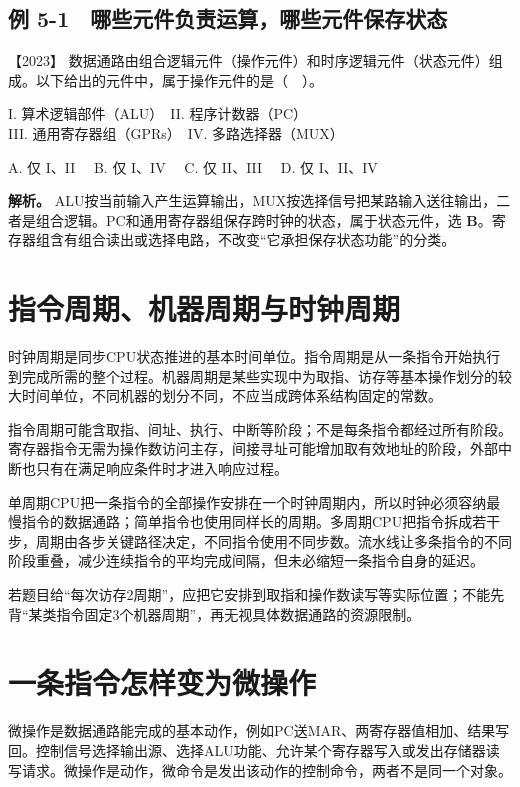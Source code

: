 \subsection{例 5-1　哪些元件负责运算，哪些元件保存状态}\label{co-ex5-1}

\noindent{}【2023】 数据通路由组合逻辑元件（操作元件）和时序逻辑元件（状态元件）组成。以下给出的元件中，属于操作元件的是（　）。

I. 算术逻辑部件（ALU）　II. 程序计数器（PC）\\
III. 通用寄存器组（GPRs）　IV. 多路选择器（MUX）

A. 仅 I、II　 B. 仅 I、IV　 C. 仅 II、III　 D. 仅 I、II、IV


\textbf{解析。} ALU按当前输入产生运算输出，MUX按选择信号把某路输入送往输出，二者是组合逻辑。PC和通用寄存器组保存跨时钟的状态，属于状态元件，选 \textbf{B}。寄存器组含有组合读出或选择电路，不改变``它承担保存状态功能''的分类。

\section{指令周期、机器周期与时钟周期}\label{co-05-02}

时钟周期是同步CPU状态推进的基本时间单位。指令周期是从一条指令开始执行到完成所需的整个过程。机器周期是某些实现中为取指、访存等基本操作划分的较大时间单位，不同机器的划分不同，不应当成跨体系结构固定的常数。

指令周期可能含取指、间址、执行、中断等阶段；不是每条指令都经过所有阶段。寄存器指令无需为操作数访问主存，间接寻址可能增加取有效地址的阶段，外部中断也只有在满足响应条件时才进入响应过程。

单周期CPU把一条指令的全部操作安排在一个时钟周期内，所以时钟必须容纳最慢指令的数据通路；简单指令也使用同样长的周期。多周期CPU把指令拆成若干步，周期由各步关键路径决定，不同指令使用不同步数。流水线让多条指令的不同阶段重叠，减少连续指令的平均完成间隔，但未必缩短一条指令自身的延迟。

若题目给``每次访存2周期''，应把它安排到取指和操作数读写等实际位置；不能先背``某类指令固定3个机器周期''，再无视具体数据通路的资源限制。

\section{一条指令怎样变为微操作}\label{co-05-03}

微操作是数据通路能完成的基本动作，例如PC送MAR、两寄存器值相加、结果写回。控制信号选择输出源、选择ALU功能、允许某个寄存器写入或发出存储器读写请求。微操作是动作，微命令是发出该动作的控制命令，两者不是同一个对象。

